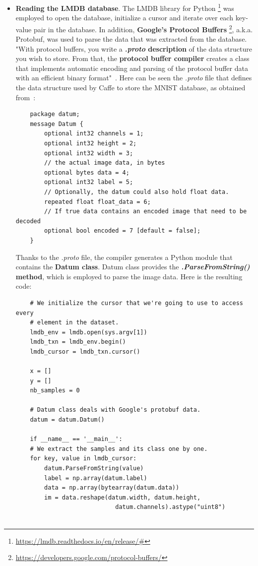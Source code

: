 \begin{itemize}
	\item \textbf{Reading the LMDB database}. The LMDB library for Python \footnote{\url{https://lmdb.readthedocs.io/en/release/\#}} was employed to open the database, initialize a cursor and iterate over each key-value pair in the database. In addition, \textbf{Google's Protocol Buffers} \footnote{\url{https://developers.google.com/protocol-buffers/}}, a.k.a. Protobuf, was used to parse the data that was extracted from the database. "With protocol buffers, you write a \textbf{\textit{.proto} description} of the data structure you wish to store. From that, the \textbf{protocol buffer compiler} creates a class that implements automatic encoding and parsing of the protocol buffer data with an efficient binary format"~\cite{protobuf}. Here can be seen the \textit{.proto} file that defines the data structure used by Caffe to store the MNIST database, as obtained from~\cite{lmdb_tutorial}: 
	\begin{lstlisting}
	package datum;
	message Datum {
		optional int32 channels = 1;
		optional int32 height = 2;
		optional int32 width = 3;
		// the actual image data, in bytes
		optional bytes data = 4;
	 	optional int32 label = 5;
	 	// Optionally, the datum could also hold float data.
	 	repeated float float_data = 6;
	 	// If true data contains an encoded image that need to be decoded
	 	optional bool encoded = 7 [default = false];
	}
	\end{lstlisting}
	 
	Thanks to the \textit{.proto} file, the compiler generates a Python module that contains the \textbf{Datum class}. Datum class provides the \textbf{\textit{.ParseFromString()} method}, which is employed to parse the image data. Here is the resulting code:
	\begin{lstlisting}
	# We initialize the cursor that we're going to use to access every
	# element in the dataset.
	lmdb_env = lmdb.open(sys.argv[1])
	lmdb_txn = lmdb_env.begin()
	lmdb_cursor = lmdb_txn.cursor()
	
	x = []
	y = []
	nb_samples = 0
	
	# Datum class deals with Google's protobuf data.
	datum = datum.Datum()
	 
	if __name__ == '__main__':
	# We extract the samples and its class one by one.
	for key, value in lmdb_cursor:
		datum.ParseFromString(value)
		label = np.array(datum.label)
		data = np.array(bytearray(datum.data))
		im = data.reshape(datum.width, datum.height,
							datum.channels).astype("uint8")
	 

\end{lstlisting}
\end{itemize}
